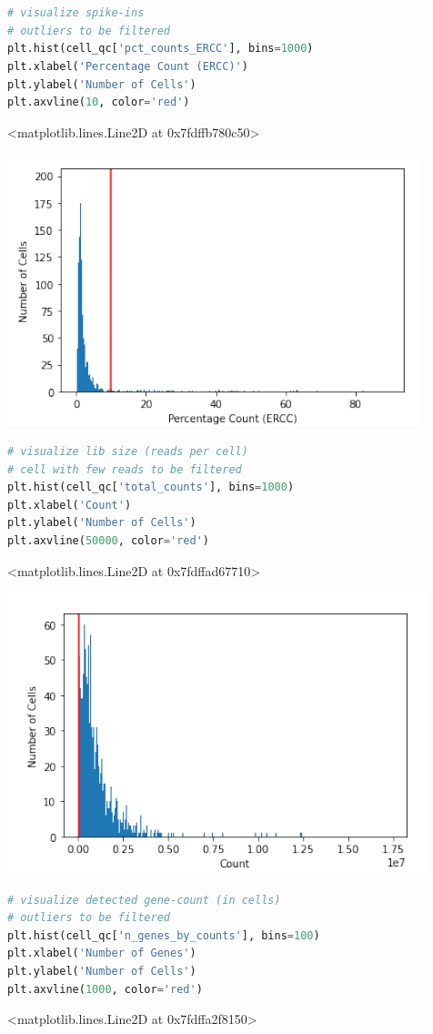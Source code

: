 \documentclass{article}
\begin{document}
\begin{lstlisting}[language=Python]


# visualize spike-ins
# outliers to be filtered
plt.hist(cell_qc['pct_counts_ERCC'], bins=1000)
plt.xlabel('Percentage Count (ERCC)')
plt.ylabel('Number of Cells')
plt.axvline(10, color='red')
\end{lstlisting}
<matplotlib.lines.Line2D at 0x7fdffb780c50>

\includegraphics[]{Table-1.png}

\begin{lstlisting}[language=Python]
# visualize lib size (reads per cell)
# cell with few reads to be filtered
plt.hist(cell_qc['total_counts'], bins=1000)
plt.xlabel('Count')
plt.ylabel('Number of Cells')
plt.axvline(50000, color='red')
\end{lstlisting}
<matplotlib.lines.Line2D at 0x7fdffad67710>

\includegraphics[]{Table-2.png}

\begin{lstlisting}[language=python]
# visualize detected gene-count (in cells)
# outliers to be filtered
plt.hist(cell_qc['n_genes_by_counts'], bins=100)
plt.xlabel('Number of Genes')
plt.ylabel('Number of Cells')
plt.axvline(1000, color='red')
\end{lstlisting}
<matplotlib.lines.Line2D at 0x7fdffa2f8150>
\end{document}
